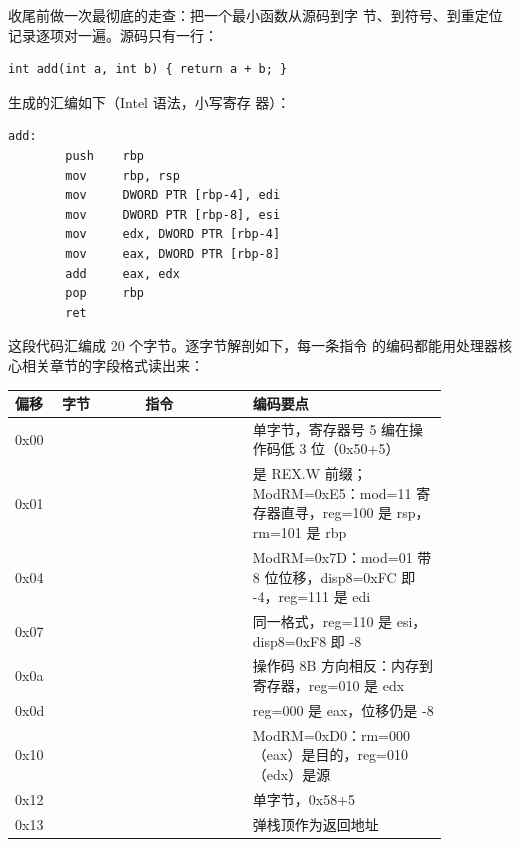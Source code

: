 收尾前做一次最彻底的走查：把一个最小函数从源码到字
节、到符号、到重定位记录逐项对一遍。源码只有一行：

\begin{lstlisting}
int add(int a, int b) { return a + b; }
\end{lstlisting}

 生成的汇编如下（Intel 语法，小写寄存
器）：

\begin{lstlisting}
add:
        push    rbp
        mov     rbp, rsp
        mov     DWORD PTR [rbp-4], edi
        mov     DWORD PTR [rbp-8], esi
        mov     edx, DWORD PTR [rbp-4]
        mov     eax, DWORD PTR [rbp-8]
        add     eax, edx
        pop     rbp
        ret
\end{lstlisting}

这段代码汇编成 20 个字节。逐字节解剖如下，每一条指令
的编码都能用处理器核心相关章节的字段格式读出来：

\begin{longtable}{L{0.07\linewidth}L{0.17\linewidth}L{0.22\linewidth}L{0.4\linewidth}}
\toprule
偏移 & 字节 & 指令 & 编码要点 \\
\midrule
0x00 &  &  & 单字节，寄存器号 5 编在操作码低 3 位（0x50+5） \\\tablerowrule
0x01 &  &  &  是 REX.W 前缀；ModRM=0xE5：mod=11 寄存器直寻，reg=100 是 rsp，rm=101 是 rbp \\\tablerowrule
0x04 &  &  & ModRM=0x7D：mod=01 带 8 位位移，disp8=0xFC 即 -4，reg=111 是 edi \\\tablerowrule
0x07 &  &  & 同一格式，reg=110 是 esi，disp8=0xF8 即 -8 \\\tablerowrule
0x0a &  &  & 操作码 8B 方向相反：内存到寄存器，reg=010 是 edx \\\tablerowrule
0x0d &  &  & reg=000 是 eax，位移仍是 -8 \\\tablerowrule
0x10 &  &  & ModRM=0xD0：rm=000（eax）是目的，reg=010（edx）是源 \\\tablerowrule
0x12 &  &  & 单字节，0x58+5 \\\tablerowrule
0x13 &  &  & 弹栈顶作为返回地址 \\
\bottomrule
\end{longtable}


